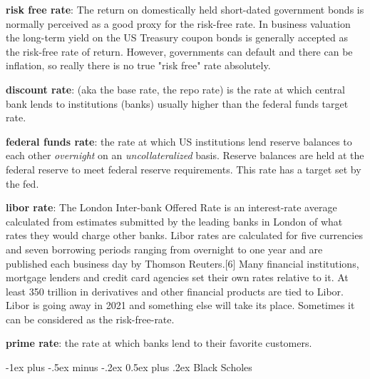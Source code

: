\documentclass[10pt,landscape]{article}
\makeatletter
\renewcommand{\section}{\@startsection{section}{1}{0mm}%
                                {-1ex plus -.5ex minus -.2ex}%
                                {0.5ex plus .2ex}%
                                {\normalfont\large\bfseries}}
\makeatother
\begin{document}
\begin{multicols}{3}
\vspace{0.15cm}

\textbf{risk free rate}: The return on domestically held short-dated government bonds is normally perceived as a good proxy for the risk-free rate. In business valuation the long-term yield on the US Treasury coupon bonds is generally accepted as the risk-free rate of return. However, governments can default and there can be inflation, so really there is no true "risk free" rate absolutely.

\vspace{0.15cm}

\textbf{discount rate}: (aka the base rate, the repo rate) is the rate at which central bank lends to institutions (banks) usually  higher than the federal funds target rate.

\vspace{0.15cm}

\textbf{federal funds rate}: the rate at which US institutions lend reserve balances to each other \textit{overnight} on an \textit{uncollateralized} basis. Reserve balances are held at the federal reserve to meet federal reserve requirements. This rate has a target set by the fed.

\vspace{0.15cm}

\textbf{libor rate}: The London Inter-bank Offered Rate is an interest-rate average calculated from estimates submitted by the leading banks in London of what rates they would charge other banks. Libor rates are calculated for five currencies and seven borrowing periods ranging from overnight to one year and are published each business day by Thomson Reuters.[6] Many financial institutions, mortgage lenders and credit card agencies set their own rates relative to it. At least 350 trillion in derivatives and other financial products are tied to Libor. Libor is going away in 2021 and something else will take its place. Sometimes it can be considered as the risk-free-rate.

\vspace{0.15cm}

\textbf{prime rate}: the rate at which banks lend to their favorite customers.

\vspace{0.15cm}


\section{Black Scholes}


\end{multicols}
\end{document}
